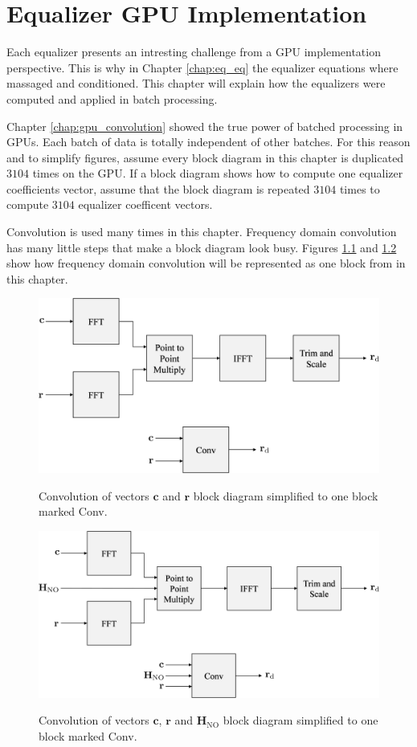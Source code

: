 \chapter{Equalizer GPU Implementation}
Each equalizer presents an intresting challenge from a GPU implementation perspective.
This is why in Chapter \ref{chap:eq_eq} the equalizer equations where massaged and conditioned.
This chapter will explain how the equalizers were computed and applied in batch processing.

Chapter \ref{chap:gpu_convolution} showed the true power of batched processing in GPUs.
Each batch of data is totally independent of other batches.
For this reason and to simplify figures, assume every block diagram in this chapter is duplicated $3104$ times on the GPU.
If a block diagram shows how to compute one equalizer coefficients vector, assume that the block diagram is repeated $3104$ times to compute $3104$ equalizer coefficent vectors.

Convolution is used many times in this chapter.
Frequency domain convolution has many little steps that make a block diagram look busy.
Figures \ref{fig:Conv2} and \ref{fig:Conv3} show how frequency domain convolution will be represented as one block from in this chapter.
\begin{figure}
	\caption{Convolution of vectors $\mathbf{c}$ and $\mathbf{r}$ block diagram simplified to one block marked Conv.}
	\centering\includegraphics[width=9.27in/100*55]{figures/gpu_convolution/Conv2.pdf}
	\label{fig:Conv2}
\end{figure}
\begin{figure}
	\caption{Convolution of vectors $\mathbf{c}$, $\mathbf{r}$ and $\mathbf{H}_{\text{NO}}$ block diagram simplified to one block marked Conv.}
	\centering\includegraphics[width=9.27in/100*55]{figures/gpu_convolution/Conv3.pdf}
	\label{fig:Conv3}
\end{figure}


